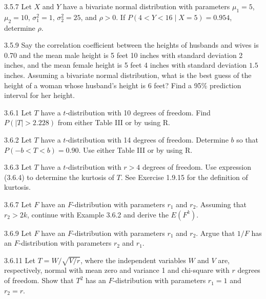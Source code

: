 \begin{exercise}{3.5.7}
Let $X$ and $Y$ have a bivariate normal distribution with parameters $\mu_1 = 5$, $\mu_2 = 10$, $\sigma_1^2 = 1$, $\sigma_2^2 = 25$, and $\rho > 0$. If $P(4 < Y < 16 \mid X = 5) = 0.954$, determine $\rho$.
\end{exercise}

\begin{exercise}{3.5.9}
Say the correlation coefficient between the heights of husbands and wives is 0.70 and the mean male height is 5 feet 10 inches with standard deviation 2 inches, and the mean female height is 5 feet 4 inches with standard deviation $1.5$ inches. Assuming a bivariate normal distribution, what is the best guess of the height of a woman whose husband's height is 6 feet? Find a 95\% prediction interval for her height.
\end{exercise}

\begin{exercise}{3.6.1}
Let $T$ have a $t$-distribution with 10 degrees of freedom. Find $P(|T| > 2.228)$ from either Table III or by using R.
\end{exercise}

\begin{exercise}{3.6.2}
Let $T$ have a $t$-distribution with 14 degrees of freedom. Determine $b$ so that $P(-b < T < b) = 0.90$. Use either Table III or by using R.
\end{exercise}

\begin{exercise}{3.6.3}
Let $T$ have a $t$-distribution with $r > 4$ degrees of freedom. Use expression (3.6.4) to determine the kurtosis of $T$. See Exercise 1.9.15 for the definition of kurtosis.
\end{exercise}

\begin{exercise}{3.6.7}
Let $F$ have an $F$-distribution with parameters $r_1$ and $r_2$. Assuming that $r_2 > 2k$, continue with Example 3.6.2 and derive the $E(F^k)$.
\end{exercise}

\begin{exercise}{3.6.9}
Let $F$ have an $F$-distribution with parameters $r_1$ and $r_2$. Argue that $1/F$ has an $F$-distribution with parameters $r_2$ and $r_1$.
\end{exercise}

\begin{exercise}{3.6.11}
Let $T = W/\sqrt{V/r}$, where the independent variables $W$ and $V$ are, respectively, normal with mean zero and variance 1 and chi-square with $r$ degrees of freedom. Show that $T^2$ has an $F$-distribution with parameters $r_1 = 1$ and $r_2 = r$.
\end{exercise}

